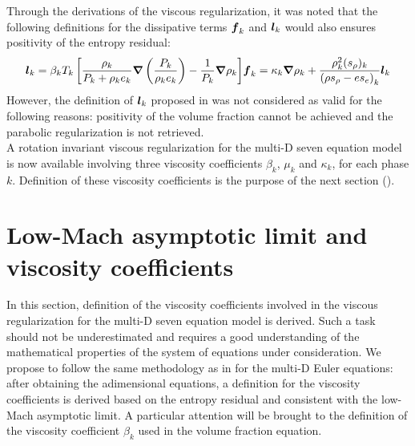 %
Through the derivations of the viscous regularization, it was noted that the following definitions for the dissipative terms $\boldsymbol f_k$ and $\boldsymbol l_k$ would also ensures positivity of the entropy residual:
%
\begin{subequations}
\begin{align}\label{eq:def-l-k-wrong-sect4}
\mbold l_k =\beta_k T_k \left[ \frac{\rho_k}{P_k+\rho_k e_k} \grad \left( \frac{P_k}{\rho_k e_k} \right) - \frac{1}{P_k} \grad \rho_k \right]
\end{align}
\begin{align}
\mbold f_k = \kappa_k \grad \rho_k +  \frac{\rho^2_k (s_{\rho})_k}{\left( \rho s_{\rho} - e s_e \right)_k} \mbold l_k
\end{align}
\end{subequations}
%
However, the definition of $\boldsymbol l_k$ proposed in  was not considered as valid for the following reasons: positivity of the volume fraction cannot be achieved and the parabolic regularization is not retrieved.\\ 

A rotation invariant viscous regularization for the multi-D seven equation model is now available involving three viscosity coefficients $\beta_k$, $\mu_k$ and $\kappa_k$, for each phase $k$. Definition of these viscosity coefficients is the purpose of the next section ().
\section{Low-Mach asymptotic limit and viscosity coefficients}\label{sec:sev-equ-visc-coeff-sect4}
In this section, definition of the viscosity coefficients involved in the viscous regularization for the multi-D seven equation model is derived. Such a task should not be underestimated and requires a good understanding of the mathematical properties of the system of equations under consideration. We propose to follow the same methodology as in  for the multi-D Euler equations: after obtaining the adimensional equations, a definition for the viscosity coefficients is derived based on the entropy residual and consistent with the low-Mach asymptotic limit. A particular attention will be brought to the definition of the viscosity coefficient $\beta_k$ used in the volume fraction equation.
